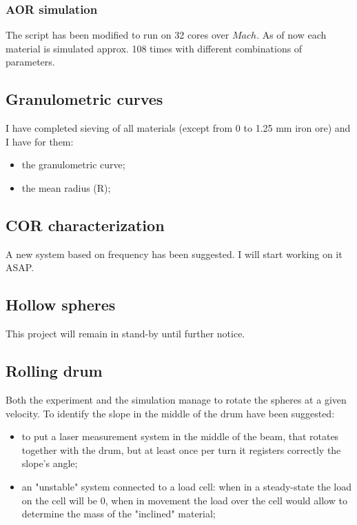 \subsubsection{AOR simulation}
\label{subsubsection:aorsimulation}

The script has been modified to run on 32 cores over $Mach$. As of now each material is simulated approx. 108 times with different combinations of parameters.\\

\subsection{Granulometric curves}
\label{subsection:granulometric curves}

I have completed sieving of all materials (except from 0 to 1.25 mm iron ore) and I have for them:
\begin{itemize}
\item{the granulometric curve;}
\item{the mean radius (R);}
\end{itemize}

\subsection{COR characterization}
\label{subsection:corcharacterization}

A new system based on frequency has been suggested. I will start working on it ASAP.

\subsection{Hollow spheres}
\label{subsection:hollowspheres}

This project will remain in stand-by until further notice.

\subsection{Rolling drum}
\label{subsection:rolling drum}

Both the experiment and the simulation manage to rotate the spheres at a given velocity.
To identify the slope in the middle of the drum have been suggested:
\begin{itemize}
\item{to put a laser measurement system in the middle of the beam, that rotates together with the drum, but at least once per turn it registers correctly the slope's angle;}
\item{an "unstable" system connected to a load cell: when in a steady-state the load on the cell will be $0$, when in movement the load over the cell would allow to determine the mass of the "inclined" material;}
\end{itemize}

